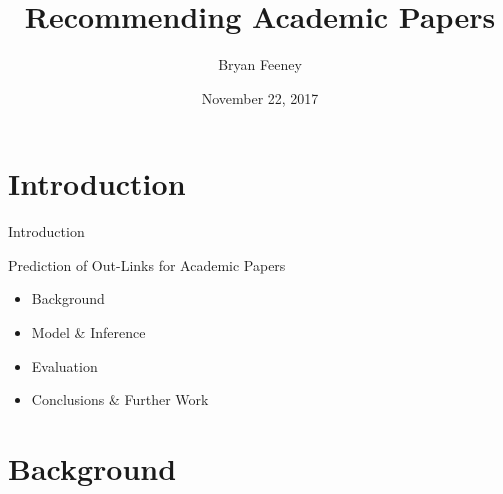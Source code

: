 \documentclass[xcolor=dvipsnames]{beamer}
\author{Bryan Feeney}
\title{Recommending Academic Papers}
\institute[Amazon]{
 Amazon Interview Presentation
}
\date[November 22, 2017]{November 22, 2017}
\begin{document}


\begin{frame}[plain]
  \titlepage
\end{frame}






\section{Introduction}
\begin{frame}{Introduction}

Prediction of Out-Links for Academic Papers

\begin{itemize}
    \item Background
    \item Model \& Inference
    \item Evaluation
    \item Conclusions \& Further Work
\end{itemize}


\end{frame}


\section{Background}
\end{document}
